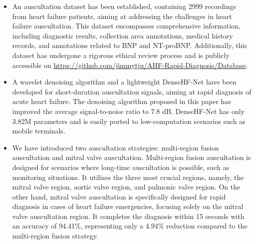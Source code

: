 \begin{itemize}
\item  An auscultation dataset has been established, containing 2999  recordings from heart failure patients, aiming at addressing the challenges in heart failure auscultation. This dataset encompasses comprehensive information, including diagnostic results, collection area annotations, medical history records, and annotations related to BNP and NT-proBNP. Additionally, this dataset has undergone a rigorous ethical review process and is publicly accessible on \href{https://github.com/jimmytju/AHF-Rapid-Diagnosis/Database}{https://github.com/jimmytju/AHF-Rapid-Diagnosis/Database}.
\item A wavelet denoising algorithm and a lightweight DenseHF-Net have been developed for short-duration auscultation signals, aiming at rapid diagnosis of acute heart failure. The denoising algorithm proposed in this paper has improved the average signal-to-noise ratio to 7.8 dB. DenseHF-Net has only 3.82M parameters and is easily ported to low-computation scenarios such as mobile terminals. 
\item We have introduced two auscultation strategies: multi-region fusion auscultation and mitral valve auscultation. Multi-region fusion auscultation is designed for scenarios where long-time auscultation is possible, such as monitoring situations. It utilizes the three most crucial regions, namely, the mitral valve region, aortic valve region, and pulmonic valve region. On the other hand, mitral valve auscultation is specifically designed for rapid diagnosis in cases of heart failure emergencies, focusing solely on the mitral valve auscultation region. It completes the diagnosis within 15 seconds with an accuracy of 94.41\%, representing only a 4.94\% reduction compared to the multi-region fusion strategy.
\end{itemize}

